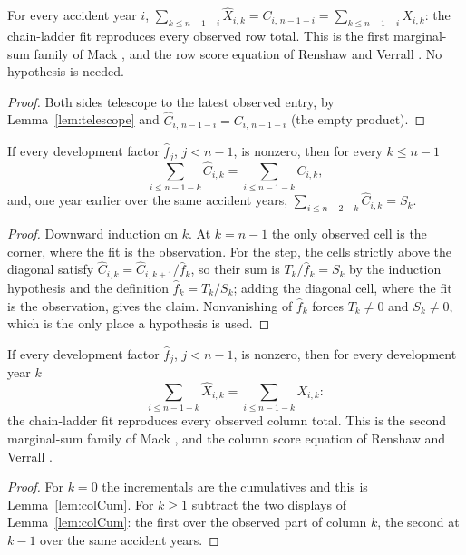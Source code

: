 \begin{theorem}\label{thm:odpRow}\leanok
{}
For every accident year $i$,
$\sum_{k \le n-1-i} \hat X_{i,k} = C_{i,\,n-1-i} = \sum_{k \le n-1-i} X_{i,k}$: the
chain-ladder fit reproduces every observed row total. This is the first marginal-sum
family of Mack \cite[Section 2]{Mack1991}, and the row score equation of Renshaw and Verrall
\cite[Section 3]{RenshawVerrall1998}. No hypothesis is needed.
\end{theorem}
\begin{proof}\leanok
Both sides telescope to the latest observed entry, by Lemma~\ref{lem:telescope} and
$\hat C_{i,\,n-1-i} = C_{i,\,n-1-i}$ (the empty product).
\end{proof}

\begin{lemma}\label{lem:colCum}\leanok
{}
If every development factor $\hat f_j$, $j < n-1$, is nonzero, then for every $k \le n-1$
\[
  \sum_{i \le n-1-k} \hat C_{i,k} = \sum_{i \le n-1-k} C_{i,k},
\]
and, one year earlier over the same accident years,
$\sum_{i \le n-2-k} \hat C_{i,k} = S_k$.
\end{lemma}
\begin{proof}\leanok
Downward induction on $k$. At $k = n-1$ the only observed cell is the corner, where the
fit is the observation. For the step, the cells strictly above the diagonal satisfy
$\hat C_{i,k} = \hat C_{i,k+1}/\hat f_k$, so their sum is $T_k/\hat f_k = S_k$ by the
induction hypothesis and the definition $\hat f_k = T_k/S_k$; adding the diagonal cell,
where the fit is the observation, gives the claim. Nonvanishing of $\hat f_k$ forces
$T_k \ne 0$ and $S_k \ne 0$, which is the only place a hypothesis is used.
\end{proof}

\begin{theorem}\label{thm:odpCol}\leanok
{}
If every development factor $\hat f_j$, $j < n-1$, is nonzero, then for every
development year $k$
\[
  \sum_{i \le n-1-k} \hat X_{i,k} = \sum_{i \le n-1-k} X_{i,k}:
\]
the chain-ladder fit reproduces every observed column total. This is the second
marginal-sum family of Mack \cite[Section 2]{Mack1991}, and the column score equation of Renshaw
and Verrall \cite[Section 3]{RenshawVerrall1998}.
\end{theorem}
\begin{proof}\leanok
For $k = 0$ the incrementals are the cumulatives and this is Lemma~\ref{lem:colCum}. For
$k \ge 1$ subtract the two displays of Lemma~\ref{lem:colCum}: the first over the
observed part of column $k$, the second at $k-1$ over the same accident years.
\end{proof}

